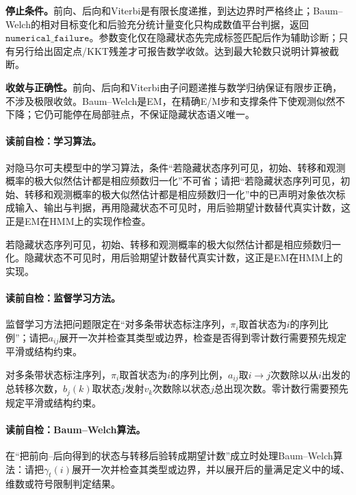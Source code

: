 \label{struct:V3-C05-CH24}
\textbf{停止条件。}前向、后向和Viterbi是有限长度递推，到达边界时严格终止；Baum--Welch的相对目标变化和后验充分统计量变化只构成数值平台判据，返回$\mathtt{numerical\_failure}$。参数变化仅在隐藏状态先完成标签匹配后作为辅助诊断；只有另行给出固定点/KKT残差才可报告数学收敛。达到最大轮数只说明计算被截断。

\label{struct:V3-C05-CH25}
\textbf{收敛与正确性。}前向、后向和Viterbi由子问题递推与数学归纳保证有限步正确，不涉及极限收敛。Baum--Welch是EM，在精确E/M步和支撑条件下使观测似然不下降；它仍可能停在局部驻点，不保证隐藏状态语义唯一。


\paragraph{读前自检：学习算法。}对隐马尔可夫模型中的学习算法，条件“若隐藏状态序列可见，初始、转移和观测概率的极大似然估计都是相应频数归一化”不可省；请把“若隐藏状态序列可见，初始、转移和观测概率的极大似然估计都是相应频数归一化”中的已声明对象依次标成输入、输出与判据，再用隐藏状态不可见时，用后验期望计数替代真实计数，这正是EM在HMM上的实现作检查。\par

若隐藏状态序列可见，初始、转移和观测概率的极大似然估计都是相应频数归一化。隐藏状态不可见时，用后验期望计数替代真实计数，这正是EM在HMM上的实现。

\paragraph{读前自检：监督学习方法。}监督学习方法把问题限定在“对多条带状态标注序列，$\pi_i$取首状态为$i$的序列比例”；请把$a_{ij}$展开一次并检查其类型或边界，检查是否得到零计数行需要预先规定平滑或结构约束。\par

对多条带状态标注序列，$\pi_i$取首状态为$i$的序列比例，$a_{ij}$取$i\to j$次数除以从$i$出发的总转移次数，$b_j(k)$取状态$j$发射$v_k$次数除以状态$j$总出现次数。零计数行需要预先规定平滑或结构约束。

\paragraph{读前自检：Baum--Welch算法。}在“把前向--后向得到的状态与转移后验转成期望计数”成立时处理Baum--Welch算法：请把$\gamma_t(i)$展开一次并检查其类型或边界，并以展开后的量满足定义中的域、维数或符号限制判定结果。\par

